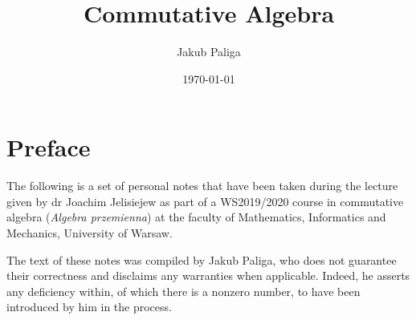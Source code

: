 \author{Jakub Paliga}
\subject{Lecture notes for}
\title{Commutative Algebra}
\date{\today}

\maketitle

\section{Preface}
The following is a set of personal notes that have been taken during the lecture given by dr Joachim Jelisiejew as part of a WS2019/2020 course in commutative algebra (\textit{Algebra przemienna}) at the faculty of Mathematics, Informatics and Mechanics, University of Warsaw.

The text of these notes was compiled by Jakub Paliga, who does not guarantee their correctness and disclaims any warranties when applicable. Indeed, he asserts any deficiency within, of which there is a nonzero number, to have been introduced by him in the process.



